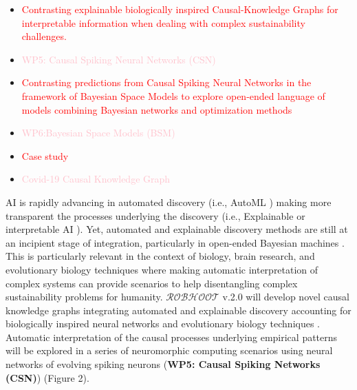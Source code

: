 \documentclass[11pt, a4paper]{article} %
\begin{document}
  \begin{itemize}
  \item \textcolor{red}{Contrasting explainable biologically inspired
      Causal-Knowledge Graphs for interpretable information when
      dealing with complex sustainability challenges.}
   \item \textcolor{pink}{WP5: Causal Spiking Neural Networks (CSN)}
   \item \textcolor{red}{Contrasting predictions from Causal Spiking
       Neural Networks in the framework of Bayesian Space Models to
       explore open-ended language of models combining Bayesian
       networks and optimization methods}
   \item \textcolor{pink}{WP6:Bayesian Space Models (BSM)}
   \item \textcolor{red}{Case study}
   \item \textcolor{pink}{Covid-19 Causal Knowledge Graph}
   \end{itemize}

   AI is rapidly advancing in automated discovery (i.e., AutoML
   \citep{Real2020}) making more transparent the processes underlying
   the discovery (i.e., Explainable or interpretable AI
   \citep{Gil2019,Futia2020}). Yet, automated and explainable
   discovery methods are still at an incipient stage of integration,
   particularly in open-ended Bayesian machines
   \citep{Guimera2020}. This is particularly relevant in the context
   of biology, brain research, and evolutionary biology techniques
   where making automatic interpretation of complex systems can
   provide scenarios to help disentangling complex sustainability
   problems for humanity. $\mathcal{ROBHOOT}$ v.2.0 will develop novel
   causal knowledge graphs integrating automated and explainable
   discovery accounting for biologically inspired neural networks and
   evolutionary biology techniques
   \citep{Maass2014,Maass2015}. Automatic interpretation of the causal
   processes underlying empirical patterns will be explored in a
   series of neuromorphic computing scenarios using neural networks of
   evolving spiking neurons ({\bf WP5: Causal Spiking Networks (CSN)})
   (Figure 2).
\end{document}
